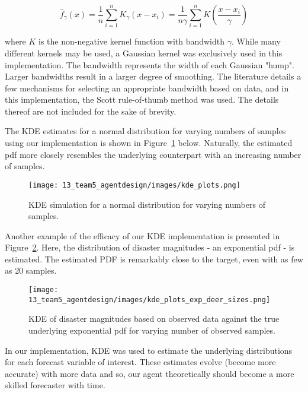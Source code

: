 \begin{equation}
\widehat{f}_{\gamma}(x)=\frac{1}{n} \sum_{i=1}^{n} K_{\gamma}\left(x-x_{i}\right)=\frac{1}{n \gamma} \sum_{i=1}^{n} K\left(\frac{x-x_{i}}{\gamma}\right)
\label{eq: KDE Estimate}
\end{equation}

where $K$ is the non-negative kernel function with bandwidth $\gamma$. While many different kernels may be used, a Gaussian kernel was exclusively used in this implementation. The bandwidth represents the width of each Gaussian "hump". Larger bandwidths result in a larger degree of smoothing. The literature details a few mechanisms for selecting an appropriate bandwidth based on data, and in this implementation, the Scott rule-of-thumb method was used. The details thereof are not included for the sake of brevity.

The KDE estimates for a normal distribution for varying numbers of samples using our implementation is shown in Figure~\ref{fig:KDE_uniform} below. Naturally, the estimated pdf more closely resembles the underlying counterpart with an increasing number of samples.

\begin{figure}[!htb]
    \centering
    \texttt{[image: 13\_team5\_agentdesign/images/kde\_plots.png]}
    \caption{KDE simulation for a normal distribution for varying numbers of samples.}
    \label{fig:KDE_uniform}
\end{figure}

Another example of the efficacy of our KDE implementation is presented in Figure~\ref{fig:kde-exp}. Here, the distribution of disaster magnitudes - an exponential pdf - is estimated. The estimated PDF is remarkably close to the target, even with as few as 20 samples.

\begin{figure}[!htb]
    \centering
    \texttt{[image: 13\_team5\_agentdesign/images/kde\_plots\_exp\_deer\_sizes.png]}
    \caption{KDE of disaster magnitudes based on observed data against the true underlying exponential pdf for varying number of observed samples.}
    \label{fig:kde-exp}
\end{figure}

In our implementation, KDE was used to estimate the underlying distributions for each forecast variable of interest. These estimates evolve (become more accurate) with more data and so, our agent theoretically should become a more skilled forecaster with time.

